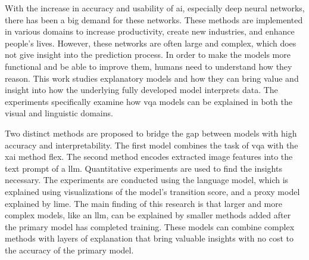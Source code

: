 \label{sec:abstract}

\begin{comment}
The abstract is often the first text the reader looks at. Thus, it should be very well written, concise and to-the-point - with the focus of SELLING your work. It is therefore often written at the very end, when you have all details of your work. Usually, we recommend something like this: i) A sentence or three about the background of the challenge you are addressing, which then leads to your "problem statement" (written as just a sentence); ii) Some text describing what you have done in your research, what have you developed, etc.; iii) A small overview of your main results and conclusions - what are the main takeaways from your thesis.

Note also that the abstract is a teaser and should therefore, not be too long: Fast to read, fast to get to the point. We often recommend keeping it on one page.
\end{comment}




With the increase in accuracy and usability of \gls{ai}, especially deep neural networks, there has been a big demand for these networks. These methods are implemented in various domains to increase productivity, create new industries, and enhance people's lives. 
However, these networks are often large and complex, which does not give insight into the prediction process. 
In order to make the models more functional and be able to improve them, humans need to understand how they reason. 
This work studies explanatory models and how they can bring value and insight into how the underlying fully developed model interprets data.
The experiments specifically examine how \gls{vqa} models can be explained in both the visual and linguistic domains.


Two distinct methods are proposed to bridge the gap between models with high accuracy and interpretability.
The first model combines the task of \gls{vqa} with the \gls{xai} method \gls{flex}. 
The second method encodes extracted image features into the text prompt of a \gls{llm}.
Quantitative experiments are used to find the insights necessary. The experiments are conducted using the language model, which is explained using visualizations of the model's transition score, and a proxy model explained by \gls{lime}.
The main finding of this research is that larger and more complex models, like an \gls{llm}, can be explained by smaller methods added after the primary model has completed training.
These models can combine complex methods with layers of explanation that bring valuable insights with no cost to the accuracy of the primary model.


